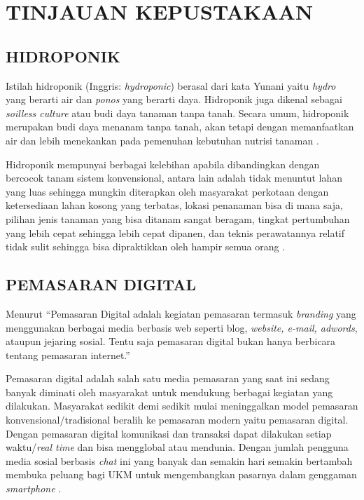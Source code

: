 \fancyhf{} 
\fancyfoot[C]{\thepage}
\chapter{TINJAUAN KEPUSTAKAAN}               

\section{\uppercase{HIDROPONIK}}
Istilah hidroponik (Inggris: \textit{hydroponic}) berasal dari kata Yunani yaitu \textit{hydro} yang berarti air dan \textit{ponos} yang berarti daya. Hidroponik juga dikenal sebagai \textit{soilless culture} atau budi daya tanaman tanpa tanah. Secara umum, hidroponik merupakan budi daya menanam tanpa tanah, akan tetapi dengan memanfaatkan air dan lebih menekankan pada pemenuhan kebutuhan nutrisi tanaman \citep{alviani2015bertanam}.

\par Hidroponik mempunyai berbagai kelebihan apabila dibandingkan dengan bercocok tanam sistem konvensional, antara lain adalah tidak menuntut lahan yang luas sehingga mungkin diterapkan oleh masyarakat perkotaan dengan ketersediaan lahan kosong yang terbatas, lokasi penanaman bisa di mana saja, pilihan jenis tanaman yang bisa ditanam sangat beragam, tingkat pertumbuhan yang lebih cepat sehingga lebih cepat dipanen, dan teknis perawatannya relatif tidak sulit sehingga bisa dipraktikkan oleh hampir semua orang \citep{iqbal2016simpel}.

\section{\uppercase{PEMASARAN DIGITAL}}
Menurut \citep{tarigan2013creative} “Pemasaran Digital adalah kegiatan pemasaran termasuk \textit{branding} yang menggunakan berbagai media berbasis web seperti blog, \textit{website, e-mail, adwords}, ataupun jejaring sosial. Tentu saja pemasaran digital bukan hanya berbicara tentang pemasaran internet.”

Pemasaran digital adalah salah satu media pemasaran yang saat ini sedang banyak diminati oleh masyarakat untuk mendukung berbagai kegiatan yang dilakukan. Masyarakat sedikit demi sedikit mulai meninggalkan model pemasaran konvensional/tradisional beralih ke pemasaran modern yaitu pemasaran digital. Dengan pemasaran digital komunikasi dan transaksi dapat dilakukan setiap waktu/\textit{real time} dan bisa mengglobal atau mendunia. Dengan jumlah pengguna media sosial berbasis \textit{chat} ini yang banyak dan semakin hari semakin bertambah membuka peluang bagi UKM untuk mengembangkan pasarnya dalam genggaman \textit{smartphone} \citep{pradiani2017pengaruh}.

